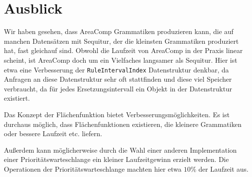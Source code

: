 \chapter{Ausblick}
\label{ausblick}

Wir haben gesehen, dass AreaComp Grammatiken produzieren kann, die auf manchen Datensätzen mit Sequitur, der die kleinsten Grammatiken produziert hat, fast gleichauf sind. Obwohl die Laufzeit von AreaComp in der Praxis linear scheint, ist AreaComp doch um ein Vielfaches langsamer als Sequitur. 
Hier ist etwa eine Verbesserung der \texttt{RuleIntervalIndex} Datenstruktur denkbar, da Anfragen an diese Datenstruktur sehr oft stattfinden und diese viel Speicher verbraucht, da für jedes Ersetzungsintervall ein Objekt in der Datenstruktur existiert.

Das Konzept der Flächenfunktion bietet Verbesserungsmöglichkeiten. Es ist durchaus möglich, dass Flächenfunktionen existieren, die kleinere Grammatiken oder bessere Laufzeit etc. liefern. 

Außerdem kann möglicherweise durch die Wahl einer anderen Implementation einer Prioritätswarteschlange ein kleiner Laufzeitgewinn erzielt werden. Die Operationen der Prioritätswarteschlange machten hier etwa $10$\% der Laufzeit aus. 


